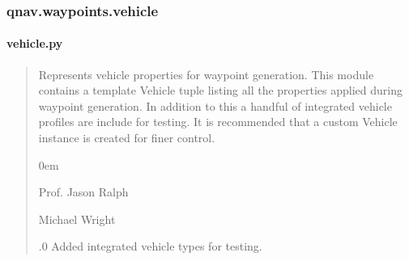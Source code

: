 \documentclass[letterpaper,10pt,english]{sphinxmanual}
\begin{document}
\sphinxstepscope


\subsubsection{qnav.waypoints.vehicle}
\label{\detokenize{modules/waypoints/vehicle:module-qnav.waypoints.vehicle}}\label{\detokenize{modules/waypoints/vehicle:qnav-waypoints-vehicle}}\label{\detokenize{modules/waypoints/vehicle::doc}}

\paragraph{vehicle.py}
\label{\detokenize{modules/waypoints/vehicle:vehicle-py}}\begin{quote}\begin{description}
\sphinxAtStartPar
Represents vehicle properties for waypoint generation.
This module contains a template Vehicle tuple listing all the properties
applied during waypoint generation. In addition to this a handful of
integrated vehicle profiles are include for testing. It is recommended
that a custom Vehicle instance is created for finer control.

\begin{DUlineblock}{0em}
\item[] Prof. Jason Ralph \sphinxhyphen{} 
\item[] Michael Wright \sphinxhyphen{} 
\end{DUlineblock}

.0 \sphinxhyphen{} Added integrated vehicle types for testing.

\end{description}\end{quote}
\end{document}
